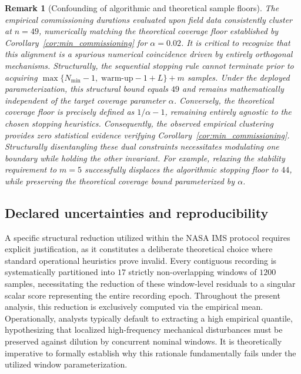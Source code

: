 \documentclass[a4paper]{cas-sc}
\newtheorem{remark}{Remark}
\begin{document}
\begin{remark}[Confounding of algorithmic and theoretical sample floors]
\label{rem:49_confound}
The empirical commissioning durations evaluated upon field data consistently cluster at \(n=49\), numerically matching the theoretical coverage floor established by Corollary~\ref{cor:min_commissioning} for \(\alpha=0.02\). It is critical to recognize that this alignment is a spurious numerical coincidence driven by entirely orthogonal mechanisms. Structurally, the sequential stopping rule cannot terminate prior to acquiring \(\max\{N_{\min}-1,\;\text{warm-up}-1+L\}+m\) samples. Under the deployed parameterization, this structural bound equals \(49\) and remains mathematically \emph{independent} of the target coverage parameter \(\alpha\). Conversely, the theoretical coverage floor is precisely defined as \(1/\alpha-1\), remaining entirely agnostic to the chosen stopping heuristics. Consequently, the observed empirical clustering provides zero statistical evidence verifying Corollary~\ref{cor:min_commissioning}. Structurally disentangling these dual constraints necessitates modulating one boundary while holding the other invariant. For example, relaxing the stability requirement to \(m=5\) successfully displaces the algorithmic stopping floor to \(44\), while preserving the theoretical coverage bound parameterized by \(\alpha\).
\end{remark}

\subsection{Declared uncertainties and reproducibility}
\label{subsec:design_reproducibility}

A specific structural reduction utilized within the NASA IMS protocol requires explicit justification, as it constitutes a deliberate theoretical choice where standard operational heuristics prove invalid. Every contiguous recording is systematically partitioned into \(17\) strictly non-overlapping windows of \(1200\) samples, necessitating the reduction of these window-level residuals to a singular scalar score representing the entire recording epoch. Throughout the present analysis, this reduction is exclusively computed via the empirical mean. Operationally, analysts typically default to extracting a high empirical quantile, hypothesizing that localized high-frequency mechanical disturbances must be preserved against dilution by concurrent nominal windows. It is theoretically imperative to formally establish why this rationale fundamentally fails under the utilized window parameterization.
\end{document}
